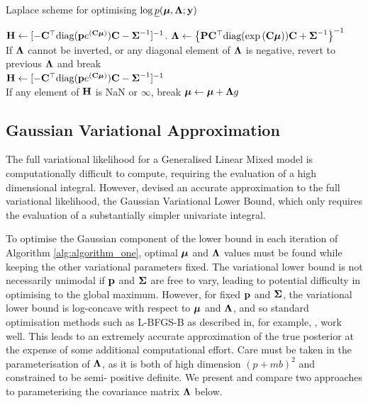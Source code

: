	\begin{algorithm}
		\caption{Laplace scheme for optimising $\log \underline{p}({\boldsymbol \mu}, {\boldsymbol \Lambda}; {\bf y})$}
		\label{alg:laplace_alg}
		\begin{algorithmic}
			\REQUIRE ${\bf H} \leftarrow [- {\bf C}^\top \text{diag}({\bf p} e^{({\bf C} {\boldsymbol \mu})}) {\bf C} - {\boldsymbol \Sigma}^{-1}]^{-1}$.
			\STATE ${\boldsymbol \Lambda} \leftarrow \left \{{\bf P} {\bf C}^\top \text{diag}(\exp{({\bf C}{\boldsymbol\mu})}) {\bf C} + {\boldsymbol \Sigma}^{-1} \right \}^{-1}$ \\ [1ex] 
			If ${\boldsymbol \Lambda}$ cannot be inverted, or any diagonal element of ${\boldsymbol \Lambda}$ is negative, revert to previous
			${\boldsymbol \Lambda}$ and break \\ [1ex]
			\STATE ${\bf H}
			\leftarrow [- {\bf C}^\top \text{diag}({\bf p} e^{({\bf C} {\boldsymbol \mu})}) {\bf C} - {\boldsymbol \Sigma}^{-1}]^{-1}$ \\ [1ex]
			If any element of ${\bf H}$ is NaN or $\infty$,
			break
			\STATE ${\boldsymbol \mu} \leftarrow {\boldsymbol\mu} + {\boldsymbol \Lambda} g$ \\ [1ex]
			\ENDWHILE
		\end{algorithmic}
	\end{algorithm}
			
	\subsection{Gaussian Variational Approximation}
			
	The full variational likelihood for a Generalised Linear Mixed model is computationally difficult to
	compute, requiring the evaluation of a high dimensional integral. However, \citep{Ormerod2012} devised
	an accurate approximation to the full variational likelihood, the Gaussian Variational Lower Bound,
	which only requires the evaluation of a substantially simpler univariate integral.
		
	To optimise the Gaussian component of the lower bound in each iteration of Algorithm
	\ref{alg:algorithm_one}, optimal ${\boldsymbol \mu}$ and ${\boldsymbol \Lambda}$ values must be found while keeping the other
	variational parameters fixed. The variational lower bound is not necessarily unimodal if ${\bf p}$ and
	${\boldsymbol \Sigma}$ are free to vary, leading to potential difficulty in optimising to the global maximum.
	However, for fixed ${\bf p}$ and ${\boldsymbol \Sigma}$, the variational lower bound is log-concave with respect to
	${\boldsymbol \mu}$ and ${\boldsymbol \Lambda}$, and so standard optimisation methods such as L-BFGS-B as described in, for
	example, \citep{Liu1989} \citep{Nocedal2006}, work well. This leads to an extremely accurate
	approximation of the true posterior at the expense of some additional computational effort. Care must be
	taken in the parameterisation of ${\boldsymbol \Lambda}$, as it is both of high dimension $(p + mb)^2$ and
	constrained to be semi- positive definite. We present and compare two approaches to parameterising the
	covariance matrix ${\boldsymbol \Lambda}$ below.
		
